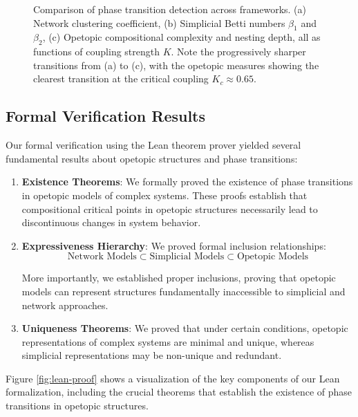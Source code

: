 \begin{figure}[ht]
\centering
\caption{Comparison of phase transition detection across frameworks. (a) Network clustering coefficient, (b) Simplicial Betti numbers $\beta_1$ and $\beta_2$, (c) Opetopic compositional complexity and nesting depth, all as functions of coupling strength $K$. Note the progressively sharper transitions from (a) to (c), with the opetopic measures showing the clearest transition at the critical coupling $K_c \approx 0.65$.}
\label{fig:framework-comparison}
\end{figure}

\subsection{Formal Verification Results}
Our formal verification using the Lean theorem prover yielded several fundamental results about opetopic structures and phase transitions:

\begin{enumerate}[leftmargin=*]
  \item \textbf{Existence Theorems}: We formally proved the existence of phase transitions in opetopic models of complex systems. These proofs establish that compositional critical points in opetopic structures necessarily lead to discontinuous changes in system behavior.
  
  \item \textbf{Expressiveness Hierarchy}: We proved formal inclusion relationships:
  $$\text{Network Models} \subset \text{Simplicial Models} \subset \text{Opetopic Models}$$
  
  More importantly, we established proper inclusions, proving that opetopic models can represent structures fundamentally inaccessible to simplicial and network approaches.
  
  \item \textbf{Uniqueness Theorems}: We proved that under certain conditions, opetopic representations of complex systems are minimal and unique, whereas simplicial representations may be non-unique and redundant.
\end{enumerate}

Figure \ref{fig:lean-proof} shows a visualization of the key components of our Lean formalization, including the crucial theorems that establish the existence of phase transitions in opetopic structures.

